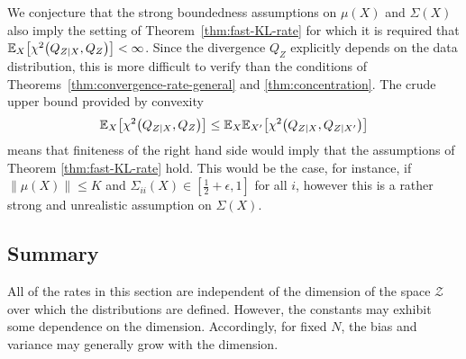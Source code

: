 %
%

We conjecture that the strong boundedness assumptions on $\mu(X)$ and $\Sigma(X)$ also imply the setting of Theorem~\ref{thm:fast-KL-rate} for which it is required that $\mathbb{E}_{X}\bigl[\chi^2\bigl(Q_{Z|X}, Q_Z\bigr)\bigr] < \infty$.
Since the divergence $Q_Z$ explicitly depends on the data distribution, this is more difficult to verify than the conditions of Theorems~\ref{thm:convergence-rate-general} and \ref{thm:concentration}.
The crude upper bound provided by convexity
\[
\mathbb{E}_{X}\bigl[\chi^2\bigl(Q_{Z|X}, Q_Z\bigr)\bigr] \leq  \mathbb{E}_{X}\mathbb{E}_{X'}\bigl[\chi^2\bigl(Q_{Z|X}, Q_{Z|X'}\bigr)\bigr]
\]
means that finiteness of the right hand side would imply that the assumptions of Theorem \ref{thm:fast-KL-rate} hold.
This would be the case, for instance, if ${\| \mu(X)\| \leq K}$ and ${\Sigma_{ii}(X) \in [\frac{1}{2}+\epsilon, 1]}$ for all $i$, however this is a rather strong and unrealistic assumption on $\Sigma(X)$.


\subsection{Summary}\label{subsection:discussion-assumptions}
All of the rates in this section are independent of the dimension of the space $\mathcal{Z}$ over which the distributions are defined.
However, the constants may exhibit some dependence on the dimension.
Accordingly, for fixed $N$, the bias and variance may generally grow with the dimension.



